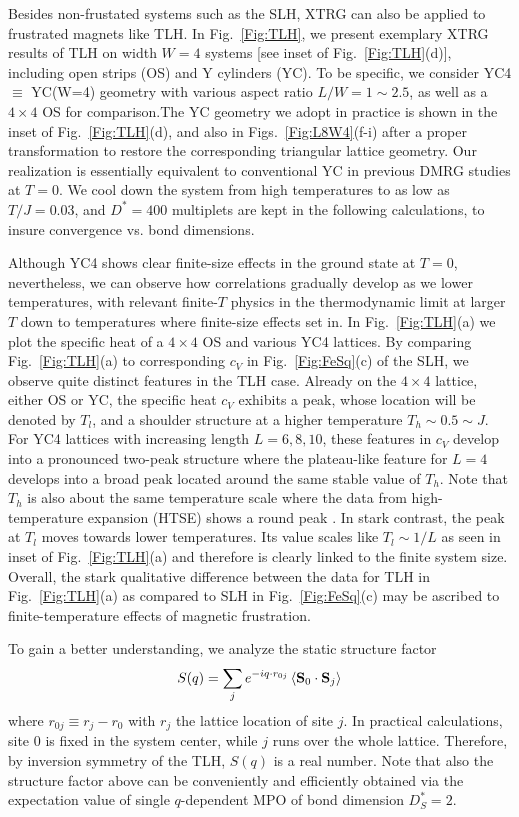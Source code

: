 \documentclass[aps,prx,twocolumn,showpacs,psfig,superscriptaddress,longbibliography]{revtex4-1}
\begin{document}
 {Besides non-frustated systems such as the SLH, XTRG can also be applied to frustrated magnets like TLH. In Fig.~\ref{Fig:TLH}, we present exemplary XTRG results of TLH on width $W=4$ systems [see inset of Fig.~\ref{Fig:TLH}(d)], including open strips (OS) and Y cylinders (YC). 
To be specific, we consider YC4 $\equiv$ YC(W=4) geometry with various aspect ratio $L/W=1 \sim 2.5$, as well as a $4\times4$ OS for comparison.The YC geometry we adopt in practice is shown in the inset of Fig.~\ref{Fig:TLH}(d), and also in Figs.~\ref{Fig:L8W4}(f-i) after a proper transformation to restore the corresponding triangular lattice geometry. Our realization is essentially equivalent to conventional YC in previous DMRG studies \cite{Hu2015} at $T=0$.
We cool down the system from high temperatures to as low as $T/J=0.03$, and $D^*=400$ multiplets are kept in the following calculations, to insure convergence vs. bond dimensions.}

 {Although YC4 shows clear finite-size effects in the ground state at $T=0$, 
nevertheless, we can observe how correlations gradually develop as we lower temperatures,
with relevant finite-$T$ physics in the thermodynamic limit at larger $T$
down to temperatures where finite-size effects set in.
%
In Fig.~\ref{Fig:TLH}(a) we plot the specific heat of a $4\times4$ OS and various YC4 lattices. By comparing Fig.~\ref{Fig:TLH}(a) to corresponding $c_V$  in Fig.~\ref{Fig:FeSq}(c) of the SLH, we observe quite distinct features in the TLH case.
Already on the $4\times4$ lattice, either OS or YC,
the specific heat $c_V$ 
exhibits a peak, whose location will be denoted by $T_l$, 
and a shoulder structure at a higher temperature $T_h \sim 0.5 \sim J$.
For YC4 lattices with increasing length $L=6,8,10$,
these features in $c_V$ develop into
a pronounced two-peak structure where the
plateau-like feature for $L=4$ develops into a broad peak
located around the same stable value of $T_h$.
Note that $T_h$ is also about the same temperature scale
where the data from high-temperature expansion (HTSE)
shows a round peak \cite{Elstner-1993}.
In stark contrast, the peak at $T_l$ moves towards lower temperatures.
Its value 
scales like $T_l  \sim 1/L$  as seen in inset of Fig.~\ref{Fig:TLH}(a) and therefore is clearly linked to the finite system size.
Overall, the stark qualitative difference
between the data for TLH in Fig.~\ref{Fig:TLH}(a)
as compared to SLH in Fig.~\ref{Fig:FeSq}(c) may
be ascribed to finite-temperature effects of magnetic frustration.
}


 {
To gain a better understanding, we analyze the static structure factor
\begin{equation}
S(q)=\sum_{j}  e^{-i q \cdot r_{0j}} %
\, \langle {\mathbf{S}}_{0}  \cdot \bold{S}_j \rangle 
\end{equation}
where $r_{0j} \equiv r_j - r_0$ with $r_j$ the lattice location of site $j$.
In practical calculations, site $0$ 
is fixed in the system center, while $j$ runs over the whole lattice.
Therefore, by inversion symmetry of the TLH, $S(q)$ is a real number.
Note that also the structure factor above can be conveniently and efficiently
obtained via the expectation value of single $q$-dependent MPO
of bond dimension $D_S^*=2$.
}
\end{document}
